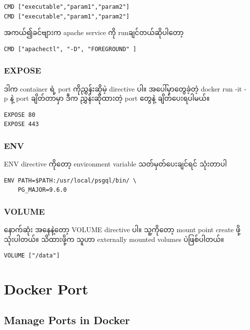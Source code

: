 \documentclass{article}
\begin{document}
\begin{verbatim}
CMD ["executable","param1","param2"]
CMD ["executable","param1","param2"]
\end{verbatim}

အကယ်​၍ခင်​​ဗျားက apache service ကို runချင်​တယ်​ဆိုပါ​တော့

\begin{verbatim}
CMD ["apachectl", "-D", "FOREGROUND" ]
\end{verbatim}

\subsubsection{EXPOSE}\label{expose}

ဒါက container ရဲ့ port ကိုညွှန်းဆိုမဲ့ directive ပါ။ အ​ပေါ်မှာ​တွေခဲ့တဲ့
docker run -it -p နဲ့ port ချိတ်​တာမှာ ဒီက ညွှန်းဆိုထားတဲ့ port ​တွေနဲ့
ချိတ်​​ပေးရပါမယ်​။

\begin{verbatim}
EXPOSE 80
EXPOSE 443
\end{verbatim}

\subsubsection{ENV}\label{env}

ENV directive ကို​တော့ environment variable သတ်​မှတ်​​ပေးချင်​ရင်​
သုံးတာပါ

\begin{verbatim}
ENV PATH=$PATH:/usr/local/psgql/bin/ \
    PG_MAJOR=9.6.0
\end{verbatim}

\subsubsection{VOLUME}\label{volume}

​နောက်​ဆုံး အ​နေနဲ့​တော့ VOLUME directive ပါ။ သူ့ကို​တော့ mount point
create ဖို့ သုံးပါတယ်​။ သိထားဖို့က သူဟာ externally mounted volumes
ပဲဖြစ်​ပါတယ်​။

\begin{verbatim}
VOLUME ["/data"]
\end{verbatim}

\section{Docker Port}\label{docker-port}

\subsection{Manage Ports in Docker}\label{manage-ports-in-docker}
\end{document}
